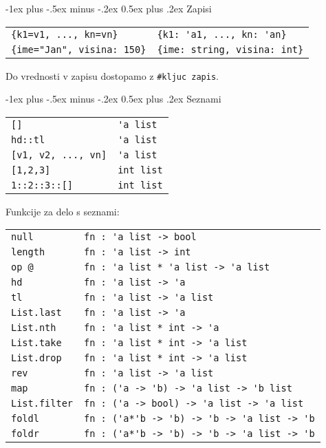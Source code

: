 \documentclass[a3paper,10pt]{extarticle}
\makeatletter
\renewcommand{\section}{\@startsection{section}{1}{0mm}%
                                {-1ex plus -.5ex minus -.2ex}%
                                {0.5ex plus .2ex}%
                                {\normalfont\large\bfseries}}
\makeatother
\begin{document}
\begin{multicols}{4}
\section{Zapisi}
\begin{tabular}{@{}ll@{}}
    \lstinline|{k1=v1, ..., kn=vn}| & \lstinline|{k1: 'a1, ..., kn: 'an}| \\
    \lstinline|{ime="Jan", visina: 150}| & \lstinline|{ime: string, visina: int}| \\
\end{tabular}

Do vrednosti v zapisu dostopamo z \lstinline|#kljuc zapis|.

\section{Seznami}
\begin{tabular}{@{}ll@{}}
    \lstinline|[]| & \lstinline|'a list|\\
    \lstinline|hd::tl| & \lstinline|'a list|\\
    \lstinline|[v1, v2, ..., vn]| & \lstinline|'a list|\\
    \lstinline|[1,2,3]| & \lstinline|int list| \\
    \lstinline|1::2::3::[]| & \lstinline|int list| \\
\end{tabular}

Funkcije za delo s seznami:

\begin{tabular}{@{}ll@{}}
    \lstinline|null| & \lstinline|fn : 'a list -> bool|\\
    \lstinline|length| & \lstinline|fn : 'a list -> int|\\
    \lstinline|op @| & \lstinline|fn : 'a list * 'a list -> 'a list|\\
    \lstinline|hd| & \lstinline|fn : 'a list -> 'a|\\
    \lstinline|tl| & \lstinline|fn : 'a list -> 'a list|\\
    \lstinline|List.last| & \lstinline|fn : 'a list -> 'a|\\
    \lstinline|List.nth| & \lstinline|fn : 'a list * int -> 'a|\\
    \lstinline|List.take| & \lstinline|fn : 'a list * int -> 'a list|\\
    \lstinline|List.drop| & \lstinline|fn : 'a list * int -> 'a list|\\
    \lstinline|rev| & \lstinline|fn : 'a list -> 'a list|\\
    \lstinline|map| & \lstinline|fn : ('a -> 'b) -> 'a list -> 'b list|\\
    \lstinline|List.filter| & \lstinline|fn : ('a -> bool) -> 'a list -> 'a list|\\
    \lstinline|foldl| & \lstinline|fn : ('a*'b -> 'b) -> 'b -> 'a list -> 'b|\\
    \lstinline|foldr| & \lstinline|fn : ('a*'b -> 'b) -> 'b -> 'a list -> 'b|\\
\end{tabular}


\end{multicols}
\end{document}
